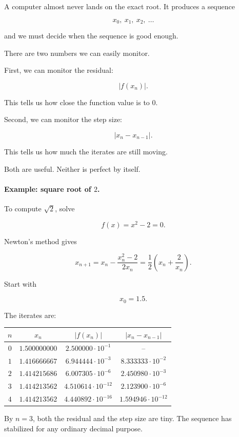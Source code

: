 A computer almost never lands on the exact root.  It produces a sequence

\[
x_0,\ x_1,\ x_2,\ \ldots
\]

and we must decide when the sequence is good enough.

There are two numbers we can easily monitor.

First, we can monitor the residual:

\[
|f(x_n)|.
\]

This tells us how close the function value is to \(0\).

Second, we can monitor the step size:

\[
|x_n-x_{n-1}|.
\]

This tells us how much the iterates are still moving.

Both are useful.  Neither is perfect by itself.

\paragraph{Example: square root of \(2\).}
To compute \(\sqrt2\), solve

\[
f(x)=x^2-2=0.
\]

Newton's method gives

\[
x_{n+1}
=
x_n-\frac{x_n^2-2}{2x_n}
=
\frac12\left(x_n+\frac2{x_n}\right).
\]

Start with

\[
x_0=1.5.
\]

The iterates are:

\begin{center}
\begin{tabular}{c|c|c|c}
\(n\) & \(x_n\) & \(|f(x_n)|\) & \(|x_n-x_{n-1}|\) \\ \hline
\(0\) & \(1.500000000\) & \(2.500000\cdot10^{-1}\) & -- \\
\(1\) & \(1.416666667\) & \(6.944444\cdot10^{-3}\) & \(8.333333\cdot10^{-2}\) \\
\(2\) & \(1.414215686\) & \(6.007305\cdot10^{-6}\) & \(2.450980\cdot10^{-3}\) \\
\(3\) & \(1.414213562\) & \(4.510614\cdot10^{-12}\) & \(2.123900\cdot10^{-6}\) \\
\(4\) & \(1.414213562\) & \(4.440892\cdot10^{-16}\) & \(1.594946\cdot10^{-12}\)
\end{tabular}
\end{center}

By \(n=3\), both the residual and the step size are tiny.  The sequence has stabilized
for any ordinary decimal purpose.

